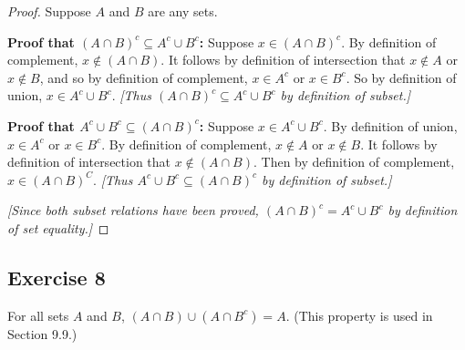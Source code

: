 \documentclass[14pt]{extarticle}
\begin{document}
\begin{proof}
  Suppose $A$ and $B$ are any sets.

    {\bf Proof that \((A \cap B)^c \subseteq A^c \cup B^c\):} Suppose \(x \in (A \cap B)^c\). By definition of
  complement, \(x \notin (A \cap B)\). It follows by definition of intersection that \(x \notin A\) or
  \(x \notin B\), and so by definition of complement, \(x \in A^c \) or \(x \in B^c\). So by definition of union,
  \(x \in A^c \cup B^c\). {\it [Thus \((A \cap B)^c \subseteq A^c \cup B^c\) by definition of subset.]}

    {\bf Proof that \(A^c \cup B^c \subseteq (A \cap B)^c\):} Suppose \(x \in A^c \cup B^c\). By definition of union,
  \(x \in A^c\) or \(x \in B^c\). By definition of complement, \(x \notin A\) or \(x \notin B\). It follows by
  definition of intersection that \(x \notin (A \cap B)\). Then by definition of complement, \(x \in (A \cap B)^C\).
    {\it [Thus \(A^c \cup B^c \subseteq (A \cap B)^c\) by definition of subset.]}

    {\it [Since both subset relations have been proved, \((A \cap B)^c = A^c \cup B^c\) by definition of set equality.]}
\end{proof}

\subsection{Exercise 8}
For all sets $A$ and $B$, \((A \cap B) \cup (A \cap B^c) = A\). (This property is used in Section 9.9.)
\end{document}

